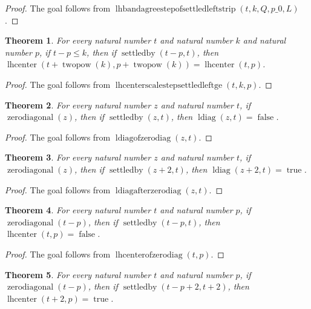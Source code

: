 \documentclass[11pt]{article}
\newtheorem{theorem}{Theorem}[section]
\theoremstyle{definition}
\begin{document}
\begin{proof}
The goal follows from \(\operatorname{lhbandagreestepofsettledleftstrip}(t, k, Q, p\_0, L)\).
\end{proof}
\begin{theorem}
\label{ll:paper:lhcenter-scale-step-settled-left-ge}
For every natural number \(t\) and natural number \(k\) and natural number \(p\), if \(t - p \le k\), then if \(\operatorname{settledby}(t - p, t)\), then \(\operatorname{lhcenter}(t + \operatorname{twopow}(k), p + \operatorname{twopow}(k)) = \operatorname{lhcenter}(t, p)\).
\end{theorem}
\begin{proof}
The goal follows from \(\operatorname{lhcenterscalestepsettledleftge}(t, k, p)\).
\end{proof}
\begin{theorem}
\label{ll:paper:ldiag-of-zero-diag}
For every natural number \(z\) and natural number \(t\), if \(\operatorname{zerodiagonal}(z)\), then if \(\operatorname{settledby}(z, t)\), then \(\operatorname{ldiag}(z, t) = \operatorname{false}\).
\end{theorem}
\begin{proof}
The goal follows from \(\operatorname{ldiagofzerodiag}(z, t)\).
\end{proof}
\begin{theorem}
\label{ll:paper:ldiag-after-zero-diag}
For every natural number \(z\) and natural number \(t\), if \(\operatorname{zerodiagonal}(z)\), then if \(\operatorname{settledby}(z + 2, t)\), then \(\operatorname{ldiag}(z + 2, t) = \operatorname{true}\).
\end{theorem}
\begin{proof}
The goal follows from \(\operatorname{ldiagafterzerodiag}(z, t)\).
\end{proof}
\begin{theorem}
\label{ll:paper:lhcenter-of-zero-diag}
For every natural number \(t\) and natural number \(p\), if \(\operatorname{zerodiagonal}(t - p)\), then if \(\operatorname{settledby}(t - p, t)\), then \(\operatorname{lhcenter}(t, p) = \operatorname{false}\).
\end{theorem}
\begin{proof}
The goal follows from \(\operatorname{lhcenterofzerodiag}(t, p)\).
\end{proof}
\begin{theorem}
\label{ll:paper:lhcenter-after-zero-diag}
For every natural number \(t\) and natural number \(p\), if \(\operatorname{zerodiagonal}(t - p)\), then if \(\operatorname{settledby}(t - p + 2, t + 2)\), then \(\operatorname{lhcenter}(t + 2, p) = \operatorname{true}\).
\end{theorem}
\end{document}
